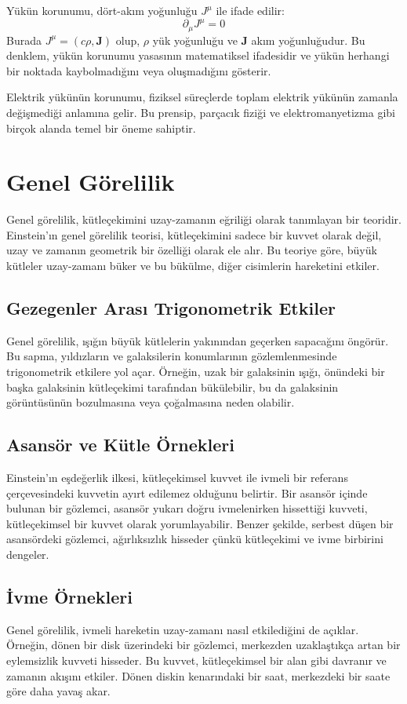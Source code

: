 \documentclass[11pt,letterpaper,twocolumn]{fenbil}
\begin{document}
Yükün korunumu, dört-akım yoğunluğu \( J^\mu \) ile ifade edilir:
\[ \partial_\mu J^\mu = 0 \]
Burada \( J^\mu = (c\rho, \mathbf{J}) \) olup, \( \rho \) yük yoğunluğu ve \( \mathbf{J} \) akım yoğunluğudur. Bu denklem, yükün korunumu yasasının matematiksel ifadesidir ve yükün herhangi bir noktada kaybolmadığını veya oluşmadığını gösterir.

Elektrik yükünün korunumu, fiziksel süreçlerde toplam elektrik yükünün zamanla değişmediği anlamına gelir. Bu prensip, parçacık fiziği ve elektromanyetizma gibi birçok alanda temel bir öneme sahiptir.

\section{Genel Görelilik}
Genel görelilik, kütleçekimini uzay-zamanın eğriliği olarak tanımlayan bir teoridir. Einstein'ın genel görelilik teorisi, kütleçekimini sadece bir kuvvet olarak değil, uzay ve zamanın geometrik bir özelliği olarak ele alır. Bu teoriye göre, büyük kütleler uzay-zamanı büker ve bu bükülme, diğer cisimlerin hareketini etkiler.

\subsection{Gezegenler Arası Trigonometrik Etkiler}
Genel görelilik, ışığın büyük kütlelerin yakınından geçerken sapacağını öngörür. Bu sapma, yıldızların ve galaksilerin konumlarının gözlemlenmesinde trigonometrik etkilere yol açar. Örneğin, uzak bir galaksinin ışığı, önündeki bir başka galaksinin kütleçekimi tarafından bükülebilir, bu da galaksinin görüntüsünün bozulmasına veya çoğalmasına neden olabilir.

\subsection{Asansör ve Kütle Örnekleri}
Einstein'ın eşdeğerlik ilkesi, kütleçekimsel kuvvet ile ivmeli bir referans çerçevesindeki kuvvetin ayırt edilemez olduğunu belirtir. Bir asansör içinde bulunan bir gözlemci, asansör yukarı doğru ivmelenirken hissettiği kuvveti, kütleçekimsel bir kuvvet olarak yorumlayabilir. Benzer şekilde, serbest düşen bir asansördeki gözlemci, ağırlıksızlık hisseder çünkü kütleçekimi ve ivme birbirini dengeler.

\subsection{İvme Örnekleri}
Genel görelilik, ivmeli hareketin uzay-zamanı nasıl etkilediğini de açıklar. Örneğin, dönen bir disk üzerindeki bir gözlemci, merkezden uzaklaştıkça artan bir eylemsizlik kuvveti hisseder. Bu kuvvet, kütleçekimsel bir alan gibi davranır ve zamanın akışını etkiler. Dönen diskin kenarındaki bir saat, merkezdeki bir saate göre daha yavaş akar.
\end{document}
